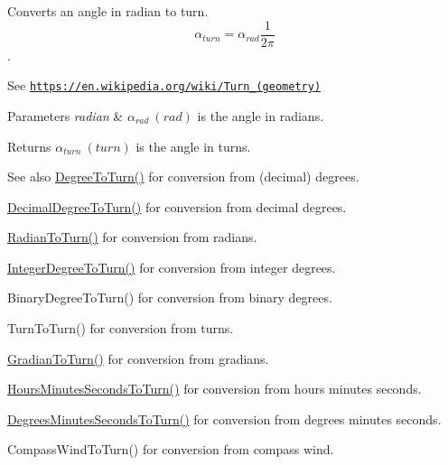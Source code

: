 Converts an angle in radian to turn. \[\alpha_{turn}=\alpha_{rad}\frac{1}{2 \pi}\]. 

See \href{https://en.wikipedia.org/wiki/Turn_(geometry)}{\tt https\+://en.\+wikipedia.\+org/wiki/\+Turn\+\_\+(geometry)} 
\begin{DoxyParams}{Parameters}
{\em radian} & $\alpha_{rad}\ (rad)$ is the angle in radians. \\
\hline
\end{DoxyParams}
\begin{DoxyReturn}{Returns}
$\alpha_{turn}\ (turn)$ is the angle in turns. 
\end{DoxyReturn}
\begin{DoxySeeAlso}{See also}
\mbox{\hyperlink{group___e_g_x_math-_angle_conversions-_degree_gafb4ce930493a7d6202ede3ee1630ef5d}{Degree\+To\+Turn()}} for conversion from (decimal) degrees. 

\mbox{\hyperlink{group___e_g_x_math-_angle_conversions-_decimal_degree_ga396a13c10acdef5026c12f3217b142c1}{Decimal\+Degree\+To\+Turn()}} for conversion from decimal degrees. 

\mbox{\hyperlink{group___e_g_x_math-_angle_conversions-_radian_ga8492d6d2f6467c619b65e5fb75a9ae04}{Radian\+To\+Turn()}} for conversion from radians. 

\mbox{\hyperlink{group___e_g_x_math-_angle_conversions-_integer_degree_ga06ddbdada5a3978105c855d4aae735ae}{Integer\+Degree\+To\+Turn()}} for conversion from integer degrees. 

Binary\+Degree\+To\+Turn() for conversion from binary degrees. 

Turn\+To\+Turn() for conversion from turns. 

\mbox{\hyperlink{group___e_g_x_math-_angle_conversions-_gradian_ga11b42138910d26474f47c0a2043911c9}{Gradian\+To\+Turn()}} for conversion from gradians. 

\mbox{\hyperlink{group___e_g_x_math-_angle_conversions-_hours_minutes_seconds_ga68050282994968cd6f80a396f6a539ae}{Hours\+Minutes\+Seconds\+To\+Turn()}} for conversion from hours minutes seconds. 

\mbox{\hyperlink{group___e_g_x_math-_angle_conversions-_degrees_minutes_seconds_ga1e6b1b889f6914942b12623934341fc6}{Degrees\+Minutes\+Seconds\+To\+Turn()}} for conversion from degrees minutes seconds. 

Compass\+Wind\+To\+Turn() for conversion from compass wind. 
\end{DoxySeeAlso}

